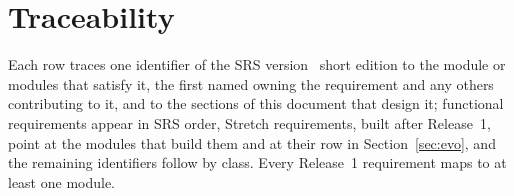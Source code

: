 \section{Traceability}\label{app:trace}

Each row traces one identifier of the SRS version~\SRSversion{} short edition to the module or modules that satisfy it, the first named owning the requirement and any others contributing to it, and to the sections of this document that design it; functional requirements appear in SRS order, Stretch requirements, built after Release~1, point at the modules that build them and at their row in Section~\ref{sec:evo}, and the remaining identifiers follow by class. Every Release~1 requirement maps to at least one module.

